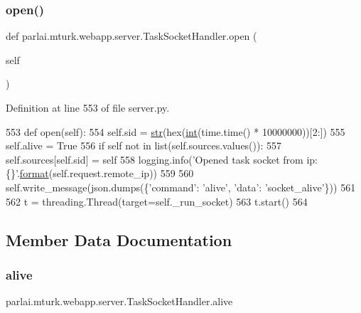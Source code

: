 \subsubsection{\texorpdfstring{open()}{open()}}
{\footnotesize\ttfamily def parlai.\+mturk.\+webapp.\+server.\+Task\+Socket\+Handler.\+open (\begin{DoxyParamCaption}\item[{}]{self }\end{DoxyParamCaption})}



Definition at line 553 of file server.\+py.


\begin{DoxyCode}
553     \textcolor{keyword}{def }open(self):
554         self.sid = \hyperlink{namespacegenerate__task__READMEs_a5b88452ffb87b78c8c85ececebafc09f}{str}(hex(\hyperlink{namespacelanguage__model_1_1eval__ppl_a7d12ee00479673c5c8d1f6d01faa272a}{int}(time.time() * 10000000))[2:])
555         self.alive = \textcolor{keyword}{True}
556         \textcolor{keywordflow}{if} self \textcolor{keywordflow}{not} \textcolor{keywordflow}{in} list(self.sources.values()):
557             self.sources[self.sid] = self
558         logging.info(\textcolor{stringliteral}{'Opened task socket from ip: \{\}'}.\hyperlink{namespaceparlai_1_1chat__service_1_1services_1_1messenger_1_1shared__utils_a32e2e2022b824fbaf80c747160b52a76}{format}(self.request.remote\_ip))
559 
560         self.write\_message(json.dumps(\{\textcolor{stringliteral}{'command'}: \textcolor{stringliteral}{'alive'}, \textcolor{stringliteral}{'data'}: \textcolor{stringliteral}{'socket\_alive'}\}))
561 
562         t = threading.Thread(target=self.\_run\_socket)
563         t.start()
564 
\end{DoxyCode}


\subsection{Member Data Documentation}
\mbox{\label{classparlai_1_1mturk_1_1webapp_1_1server_1_1TaskSocketHandler_a730b42ceee91d8ce1278f60c65595a71}} 
\subsubsection{\texorpdfstring{alive}{alive}}
{\footnotesize\ttfamily parlai.\+mturk.\+webapp.\+server.\+Task\+Socket\+Handler.\+alive}



